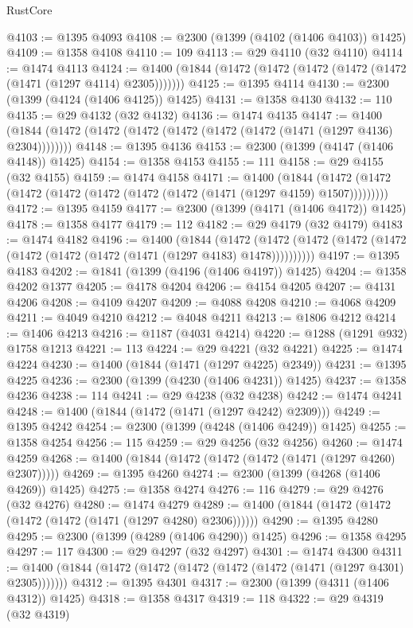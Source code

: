 \begin{lexlean}{RustCore}
\begin{coremodule}
@4103 := @1395 @4093
@4108 := @2300 (@1399 (@4102 (@1406 @4103)) @1425)
@4109 := @1358 @4108
@4110 := 109
@4113 := @29 @4110 (@32 @4110)
@4114 := @1474 @4113
@4124 := @1400 (@1844 (@1472 (@1472 (@1472 (@1472 (@1472 (@1471 (@1297 @4114) @2305)))))))
@4125 := @1395 @4114
@4130 := @2300 (@1399 (@4124 (@1406 @4125)) @1425)
@4131 := @1358 @4130
@4132 := 110
@4135 := @29 @4132 (@32 @4132)
@4136 := @1474 @4135
@4147 := @1400 (@1844 (@1472 (@1472 (@1472 (@1472 (@1472 (@1472 (@1471 (@1297 @4136) @2304))))))))
@4148 := @1395 @4136
@4153 := @2300 (@1399 (@4147 (@1406 @4148)) @1425)
@4154 := @1358 @4153
@4155 := 111
@4158 := @29 @4155 (@32 @4155)
@4159 := @1474 @4158
@4171 := @1400
    (@1844 (@1472 (@1472 (@1472 (@1472 (@1472 (@1472 (@1472 (@1471 (@1297 @4159) @1507)))))))))
@4172 := @1395 @4159
@4177 := @2300 (@1399 (@4171 (@1406 @4172)) @1425)
@4178 := @1358 @4177
@4179 := 112
@4182 := @29 @4179 (@32 @4179)
@4183 := @1474 @4182
@4196 := @1400
    (@1844
      (@1472 (@1472 (@1472 (@1472 (@1472 (@1472 (@1472 (@1472 (@1471 (@1297 @4183) @1478))))))))))
@4197 := @1395 @4183
@4202 := @1841 (@1399 (@4196 (@1406 @4197)) @1425)
@4204 := @1358 @4202 @1377
@4205 := @4178 @4204
@4206 := @4154 @4205
@4207 := @4131 @4206
@4208 := @4109 @4207
@4209 := @4088 @4208
@4210 := @4068 @4209
@4211 := @4049 @4210
@4212 := @4048 @4211
@4213 := @1806 @4212
@4214 := @1406 @4213
@4216 := @1187 (@4031 @4214)
@4220 := @1288 (@1291 @932) @1758 @1213
@4221 := 113
@4224 := @29 @4221 (@32 @4221)
@4225 := @1474 @4224
@4230 := @1400 (@1844 (@1471 (@1297 @4225) @2349))
@4231 := @1395 @4225
@4236 := @2300 (@1399 (@4230 (@1406 @4231)) @1425)
@4237 := @1358 @4236
@4238 := 114
@4241 := @29 @4238 (@32 @4238)
@4242 := @1474 @4241
@4248 := @1400 (@1844 (@1472 (@1471 (@1297 @4242) @2309)))
@4249 := @1395 @4242
@4254 := @2300 (@1399 (@4248 (@1406 @4249)) @1425)
@4255 := @1358 @4254
@4256 := 115
@4259 := @29 @4256 (@32 @4256)
@4260 := @1474 @4259
@4268 := @1400 (@1844 (@1472 (@1472 (@1472 (@1471 (@1297 @4260) @2307)))))
@4269 := @1395 @4260
@4274 := @2300 (@1399 (@4268 (@1406 @4269)) @1425)
@4275 := @1358 @4274
@4276 := 116
@4279 := @29 @4276 (@32 @4276)
@4280 := @1474 @4279
@4289 := @1400 (@1844 (@1472 (@1472 (@1472 (@1472 (@1471 (@1297 @4280) @2306))))))
@4290 := @1395 @4280
@4295 := @2300 (@1399 (@4289 (@1406 @4290)) @1425)
@4296 := @1358 @4295
@4297 := 117
@4300 := @29 @4297 (@32 @4297)
@4301 := @1474 @4300
@4311 := @1400 (@1844 (@1472 (@1472 (@1472 (@1472 (@1472 (@1471 (@1297 @4301) @2305)))))))
@4312 := @1395 @4301
@4317 := @2300 (@1399 (@4311 (@1406 @4312)) @1425)
@4318 := @1358 @4317
@4319 := 118
@4322 := @29 @4319 (@32 @4319)

\end{coremodule}
\end{lexlean}
